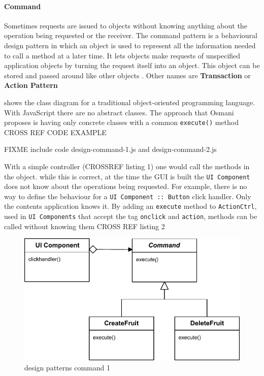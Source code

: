 \paragraph{Command} 
Sometimes requests are issued to objects without knowing anything about the operation being requested or the receiver.
The command pattern is a behavioural design pattern in which an object is used to represent all the information needed to call a method at a later time. 
It lets objects make requests of unspecified application objects by turning the request itself into an object.
This object can be stored and passed around like other objects \cite{GoF:1995}.
Other names are \textbf{Transaction} or \textbf{Action Pattern}  

 shows the class diagram for a traditional object-oriented programming language.
With JavaScript there are no abstract classes.
The approach that Osmani proposes is having only concrete classes with a common \texttt{execute()} method \cite{Osmani:2012} CROSS REF CODE EXAMPLE

FIXME include code design-command-1.js and design-command-2.js

With a simple controller (CROSSREF listing 1) one would call the methods in the object.
while this is correct, at the time the \ac{GUI} is built the \texttt{UI Component} does not know about the operations being requested.
For example, there is no way to define the behaviour for a \texttt{UI Component :: Button} click handler.
Only the contents application knows it.
By adding an \texttt{execute} method to \texttt{ActionCtrl}, used in \texttt{UI Components} that accept the tag \texttt{onclick} and \texttt{action}, methods can be called without knowing them CROSS REF listing 2

\begin{figure}[htb]
    \centering
    \includegraphics{figures/design-patterns-command-1.pdf}
    \caption{design patterns command 1}
    \label{fig:context-original}
\end{figure}

